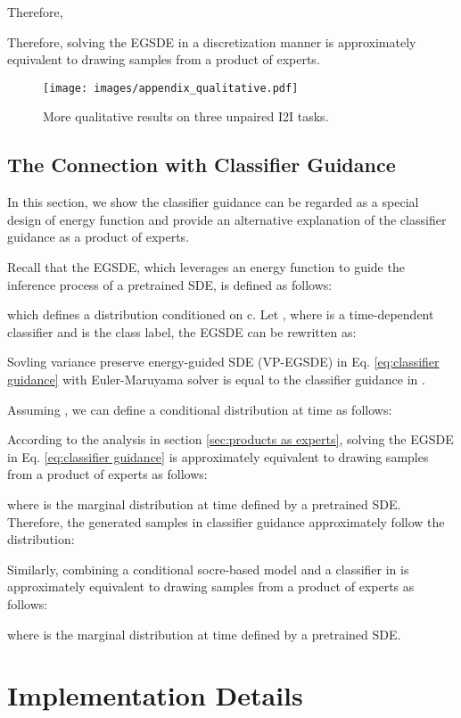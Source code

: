 \documentclass{article}
\begin{document}
Therefore,

Therefore, solving the EGSDE in a discretization manner is approximately equivalent to drawing samples from a product of experts. 
\begin{figure}
  \centering
  \texttt{[image: images/appendix\_qualitative.pdf]}
  \caption{More qualitative results on three unpaired I2I tasks.}
  \vspace{-0.5cm}
  \label{fig:more qualitative results}
\end{figure}
\subsection{The Connection with Classifier Guidance}
\label{sec:classifier guidance}
In this section, we show the classifier guidance\cite{dhariwal2021diffusion} can be regarded as a special design of energy function and provide an alternative explanation of the classifier guidance as a product of experts.

Recall that the EGSDE, which leverages an energy function to guide the inference process of a pretrained SDE, is defined as follows:

which defines a distribution  conditioned on c. Let , where  is a time-dependent classifier and  is the class label, the EGSDE can be rewritten as:

Sovling variance preserve energy-guided SDE (VP-EGSDE) in Eq. \ref{eq:classifier guidance} with Euler-Maruyama solver is equal to the classifier guidance in \cite{dhariwal2021diffusion,song2020score}.


Assuming , we can define a conditional distribution  at time  as follows: 


According to the analysis in section \ref{sec:products as experts}, solving the EGSDE in Eq. \ref{eq:classifier guidance} is approximately equivalent to drawing samples from a product of experts as follows:

where  is the marginal distribution at time  defined by a pretrained SDE. Therefore, the generated samples in classifier guidance approximately follow the distribution:

Similarly, combining a conditional socre-based model and a classifier in \cite{dhariwal2021diffusion} is approximately equivalent to drawing samples from a product of experts as follows:

where  is the marginal distribution at time  defined by a pretrained SDE.
\section{Implementation Details}
\label{sec:implementation}
\end{document}
